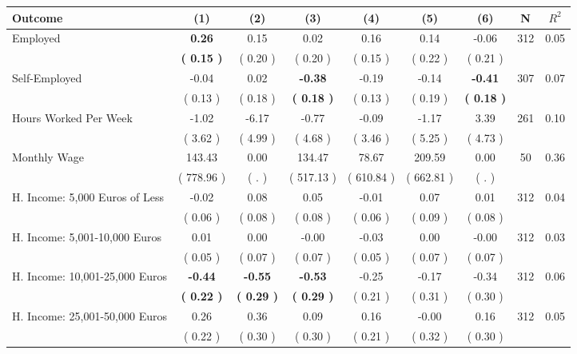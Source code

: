 \begin{tabular}{lcccccccc}
\toprule
 \textbf{Outcome} & \textbf{(1)} & \textbf{(2)} & \textbf{(3)} & \textbf{(4)} & \textbf{(5)} & \textbf{(6)} & \textbf{N} & \textbf{$ R^2$} \\
\midrule
Employed & \textbf{     0.26} &      0.15 &      0.02 &      0.16 &      0.14 &     -0.06 & 312 &       0.05 \\ 
 & \textbf{(     0.15 )} & (     0.20 ) & (     0.20 ) & (     0.15 ) & (     0.22 ) & (     0.21 ) & \\
Self-Employed &     -0.04 &      0.02 & \textbf{    -0.38} &     -0.19 &     -0.14 & \textbf{    -0.41} & 307 &       0.07 \\ 
 & (     0.13 ) & (     0.18 ) & \textbf{(     0.18 )} & (     0.13 ) & (     0.19 ) & \textbf{(     0.18 )} & \\
Hours Worked Per Week &     -1.02 &     -6.17 &     -0.77 &     -0.09 &     -1.17 &      3.39 & 261 &       0.10 \\ 
 & (     3.62 ) & (     4.99 ) & (     4.68 ) & (     3.46 ) & (     5.25 ) & (     4.73 ) & \\
Monthly Wage &    143.43 &      0.00 &    134.47 &     78.67 &    209.59 &      0.00 & 50 &       0.36 \\ 
 & (   778.96 ) & (        . ) & (   517.13 ) & (   610.84 ) & (   662.81 ) & (        . ) & \\
H. Income: 5,000 Euros of Less &     -0.02 &      0.08 &      0.05 &     -0.01 &      0.07 &      0.01 & 312 &       0.04 \\ 
 & (     0.06 ) & (     0.08 ) & (     0.08 ) & (     0.06 ) & (     0.09 ) & (     0.08 ) & \\
H. Income: 5,001-10,000 Euros &      0.01 &      0.00 &     -0.00 &     -0.03 &      0.00 &     -0.00 & 312 &       0.03 \\ 
 & (     0.05 ) & (     0.07 ) & (     0.07 ) & (     0.05 ) & (     0.07 ) & (     0.07 ) & \\
H. Income: 10,001-25,000 Euros & \textbf{    -0.44} & \textbf{    -0.55} & \textbf{    -0.53} &     -0.25 &     -0.17 &     -0.34 & 312 &       0.06 \\ 
 & \textbf{(     0.22 )} & \textbf{(     0.29 )} & \textbf{(     0.29 )} & (     0.21 ) & (     0.31 ) & (     0.30 ) & \\
H. Income: 25,001-50,000 Euros &      0.26 &      0.36 &      0.09 &      0.16 &     -0.00 &      0.16 & 312 &       0.05 \\ 
 & (     0.22 ) & (     0.30 ) & (     0.30 ) & (     0.21 ) & (     0.32 ) & (     0.30 ) & \\

\end{tabular}
